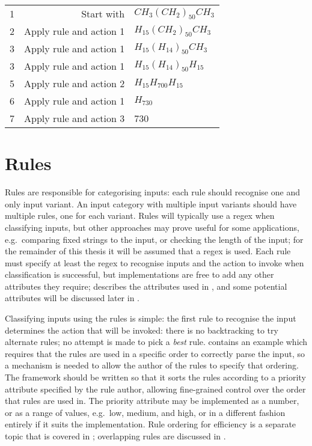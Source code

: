 \begin{tabular}{lrl}

    1 & Start with              & $CH_{3}{(CH_{2})}_{50}CH_{3}$ \\
    2 & Apply rule and action 1 & $H_{15}{(CH_{2})}_{50}CH_{3}$ \\
    3 & Apply rule and action 1 & $H_{15}{(H_{14})}_{50}CH_{3}$ \\
    3 & Apply rule and action 1 & $H_{15}{(H_{14})}_{50}H_{15}$ \\
    5 & Apply rule and action 2 & $H_{15}H_{700}H_{15}$ \\
    6 & Apply rule and action 1 & $H_{730}$ \\
    7 & Apply rule and action 3 & 730 \\

\end{tabular}

\section{Rules}

\label{rules in architecture}

Rules are responsible for categorising inputs: each rule should recognise
one and only input variant.  An input category with multiple input variants
should have multiple rules, one for each variant.  Rules will typically use
a regex when classifying inputs, but other approaches may prove useful for
some applications, e.g.\ comparing fixed strings to the input, or checking
the length of the input; for the remainder of this thesis it will be
assumed that a regex is used.  Each rule must specify at least the regex to
recognise inputs and the action to invoke when classification is
successful, but implementations are free to add any other attributes they
require;  describes the attributes used in
\parsername{}, and some potential attributes will be discussed later in
.

Classifying inputs using the rules is simple: the first rule to recognise
the input determines the action that will be invoked: there is no
backtracking to try alternate rules; no attempt is made to pick a
\textit{best\/} rule.   contains
an example which requires that the rules are used in a specific order to
correctly parse the input, so a mechanism is needed to allow the author of
the rules to specify that ordering.  The framework should be written so
that it sorts the rules according to a priority attribute specified by the
rule author, allowing fine-grained control over the order that rules are
used in.  The priority attribute may be implemented as a number, or as a
range of values, e.g.\ low, medium, and high, or in a different fashion
entirely if it suits the implementation.  Rule ordering for efficiency is a
separate topic that is covered in ; overlapping rules are discussed in .

